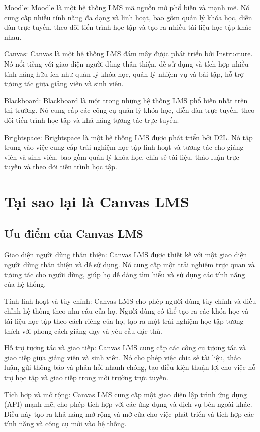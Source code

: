 \documentclass[../Thesis.tex]{subfiles}
\begin{document}
		Moodle: Moodle là một hệ thống LMS mã nguồn mở phổ biến và mạnh mẽ. Nó cung cấp nhiều tính năng đa dạng và linh hoạt, bao gồm quản lý khóa học, diễn đàn trực tuyến, theo dõi tiến trình học tập và tạo ra nhiều tài liệu học tập khác nhau.

		Canvas: Canvas là một hệ thống LMS đám mây được phát triển bởi Instructure. Nó nổi tiếng với giao diện người dùng thân thiện, dễ sử dụng và tích hợp nhiều tính năng hữu ích như quản lý khóa học, quản lý nhiệm vụ và bài tập, hỗ trợ tương tác giữa giảng viên và sinh viên.
		
		Blackboard: Blackboard là một trong những hệ thống LMS phổ biến nhất trên thị trường. Nó cung cấp các công cụ quản lý khóa học, diễn đàn trực tuyến, theo dõi tiến trình học tập và khả năng tương tác trực tuyến.
		
		Brightspace: Brightspace là một hệ thống LMS được phát triển bởi D2L. Nó tập trung vào việc cung cấp trải nghiệm học tập linh hoạt và tương tác cho giảng viên và sinh viên, bao gồm quản lý khóa học, chia sẻ tài liệu, thảo luận trực tuyến và theo dõi tiến trình học tập.

\section{Tại sao lại là Canvas LMS}

	\subsection{Ưu điểm của Canvas LMS}
		Giao diện người dùng thân thiện: Canvas LMS được thiết kế với một giao diện người dùng thân thiện và dễ sử dụng. Nó cung cấp một trải nghiệm trực quan và tương tác cho người dùng, giúp họ dễ dàng tìm hiểu và sử dụng các tính năng của hệ thống.

		Tính linh hoạt và tùy chỉnh: Canvas LMS cho phép người dùng tùy chỉnh và điều chỉnh hệ thống theo nhu cầu của họ. Người dùng có thể tạo ra các khóa học và tài liệu học tập theo cách riêng của họ, tạo ra một trải nghiệm học tập tương thích với phong cách giảng dạy và yêu cầu đặc thù.

		Hỗ trợ tương tác và giao tiếp: Canvas LMS cung cấp các công cụ tương tác và giao tiếp giữa giảng viên và sinh viên. Nó cho phép việc chia sẻ tài liệu, thảo luận, gửi thông báo và phản hồi nhanh chóng, tạo điều kiện thuận lợi cho việc hỗ trợ học tập và giao tiếp trong môi trường trực tuyến.

		Tích hợp và mở rộng: Canvas LMS cung cấp một giao diện lập trình ứng dụng (API) mạnh mẽ, cho phép tích hợp với các ứng dụng và dịch vụ bên ngoài khác. Điều này tạo ra khả năng mở rộng và mở cửa cho việc phát triển và tích hợp các tính năng và công cụ mới vào hệ thống.
\end{document}
